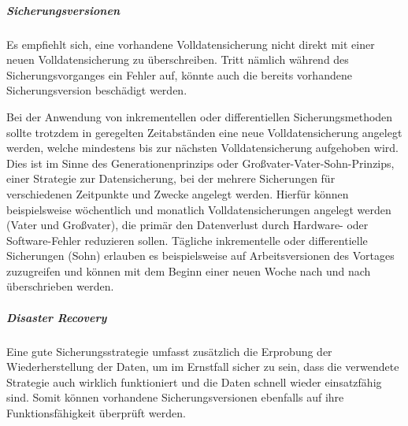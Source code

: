 \subparagraph{Sicherungsversionen} Es empfiehlt sich, eine vorhandene Volldatensicherung nicht direkt mit einer neuen Volldatensicherung zu überschreiben. Tritt nämlich während des Sicherungsvorganges ein Fehler auf, könnte auch die bereits vorhandene Sicherungsversion beschädigt werden.

Bei der Anwendung von inkrementellen oder differentiellen Sicherungsmethoden sollte trotzdem in geregelten Zeitabständen eine neue Volldatensicherung angelegt werden, welche mindestens bis zur nächsten Volldatensicherung aufgehoben wird. Dies ist im Sinne des Generationenprinzips oder Großvater-Vater-Sohn-Prinzips, einer Strategie zur Datensicherung, bei der mehrere Sicherungen für verschiedenen Zeitpunkte und Zwecke angelegt werden. Hierfür können beispielsweise wöchentlich und monatlich Volldatensicherungen angelegt werden (Vater und Großvater), die primär den Datenverlust durch Hardware- oder Software-Fehler reduzieren sollen. Tägliche inkrementelle oder differentielle Sicherungen (Sohn) erlauben es beispielsweise auf Arbeitsversionen des Vortages zuzugreifen und können mit dem Beginn einer neuen Woche nach und nach überschrieben werden. 

\subparagraph{Disaster Recovery} Eine gute Sicherungsstrategie umfasst zusätzlich die Erprobung der Wiederherstellung der Daten, um im Ernstfall sicher zu sein, dass die verwendete Strategie auch wirklich funktioniert und die Daten schnell wieder einsatzfähig sind. Somit können vorhandene Sicherungsversionen ebenfalls auf ihre Funktionsfähigkeit überprüft werden.